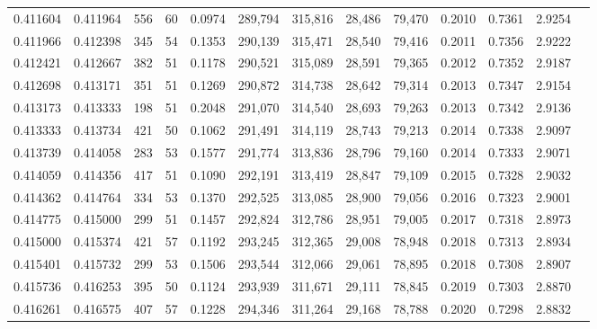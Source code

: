 \begin{tabular}{rrrrrrrrrrrrr}
0.411604 & 0.411964 &    556 &    60 &                                     0.0974 & 289,794 & 315,816 &  28,486 &  79,470 & 0.2010 & 0.7361 & 2.9254 \\
0.411966 & 0.412398 &    345 &    54 &                                     0.1353 & 290,139 & 315,471 &  28,540 &  79,416 & 0.2011 & 0.7356 & 2.9222 \\
0.412421 & 0.412667 &    382 &    51 &                                     0.1178 & 290,521 & 315,089 &  28,591 &  79,365 & 0.2012 & 0.7352 & 2.9187 \\
0.412698 & 0.413171 &    351 &    51 &                                     0.1269 & 290,872 & 314,738 &  28,642 &  79,314 & 0.2013 & 0.7347 & 2.9154 \\
0.413173 & 0.413333 &    198 &    51 &                                     0.2048 & 291,070 & 314,540 &  28,693 &  79,263 & 0.2013 & 0.7342 & 2.9136 \\
0.413333 & 0.413734 &    421 &    50 &                                     0.1062 & 291,491 & 314,119 &  28,743 &  79,213 & 0.2014 & 0.7338 & 2.9097 \\
0.413739 & 0.414058 &    283 &    53 &                                     0.1577 & 291,774 & 313,836 &  28,796 &  79,160 & 0.2014 & 0.7333 & 2.9071 \\
0.414059 & 0.414356 &    417 &    51 &                                     0.1090 & 292,191 & 313,419 &  28,847 &  79,109 & 0.2015 & 0.7328 & 2.9032 \\
0.414362 & 0.414764 &    334 &    53 &                                     0.1370 & 292,525 & 313,085 &  28,900 &  79,056 & 0.2016 & 0.7323 & 2.9001 \\
0.414775 & 0.415000 &    299 &    51 &                                     0.1457 & 292,824 & 312,786 &  28,951 &  79,005 & 0.2017 & 0.7318 & 2.8973 \\
0.415000 & 0.415374 &    421 &    57 &                                     0.1192 & 293,245 & 312,365 &  29,008 &  78,948 & 0.2018 & 0.7313 & 2.8934 \\
0.415401 & 0.415732 &    299 &    53 &                                     0.1506 & 293,544 & 312,066 &  29,061 &  78,895 & 0.2018 & 0.7308 & 2.8907 \\
0.415736 & 0.416253 &    395 &    50 &                                     0.1124 & 293,939 & 311,671 &  29,111 &  78,845 & 0.2019 & 0.7303 & 2.8870 \\
0.416261 & 0.416575 &    407 &    57 &                                     0.1228 & 294,346 & 311,264 &  29,168 &  78,788 & 0.2020 & 0.7298 & 2.8832 \\

\end{tabular}
